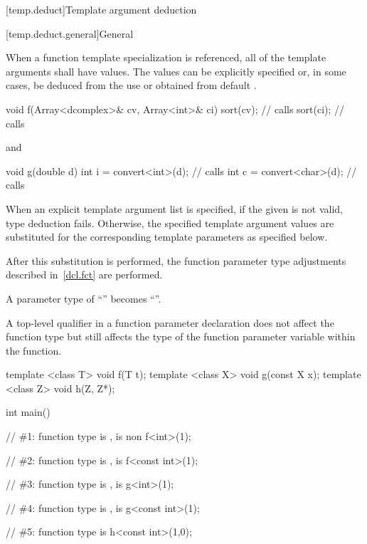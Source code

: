 [temp.deduct]{Template argument deduction}

[temp.deduct.general]{General}

\pnum
When a
function template
specialization is referenced, all of the
template arguments shall have values.
The values can be
explicitly specified or, in some cases, be deduced from the use
or obtained from default
.
\begin{example}
\begin{codeblock}
void f(Array<dcomplex>& cv, Array<int>& ci) {
  sort(cv);                     // calls 
  sort(ci);                     // calls 
}
\end{codeblock}
and
\begin{codeblock}
void g(double d) {
  int i = convert<int>(d);      // calls 
  int c = convert<char>(d);     // calls 
}
\end{codeblock}
\end{example}

\pnum
When an explicit template argument list is specified, if the
given  is not valid,
type deduction fails.
Otherwise, the specified template argument values are substituted for the
corresponding template parameters as specified below.

\pnum
After this substitution is performed, the function parameter type
adjustments described in~\ref{dcl.fct} are performed.
\begin{example}
A parameter type of ``'' becomes
``''.
\end{example}
\begin{note}
A top-level qualifier in a function parameter declaration does not affect
the function type but still affects the type of the function parameter
variable within the function.
\end{note}
\begin{example}
\begin{codeblock}
template <class T> void f(T t);
template <class X> void g(const X x);
template <class Z> void h(Z, Z*);

int main() {
  // \#1: function type is ,  is non 
  f<int>(1);

  // \#2: function type is ,  is 
  f<const int>(1);

  // \#3: function type is ,  is 
  g<int>(1);

  // \#4: function type is ,  is 
  g<const int>(1);

  // \#5: function type is 
  h<const int>(1,0);
}
\end{codeblock}
\end{example}

